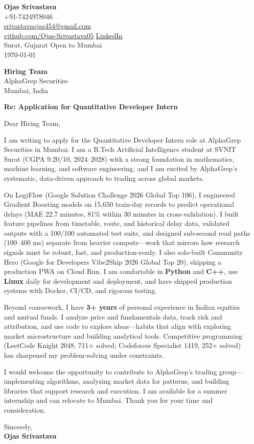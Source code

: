 \documentclass[a4paper,11pt]{article}
\begin{document}
\begin{flushright}
\textbf{Ojas Srivastava} \\
+91-7424978046 \\
\href{mailto:srivastavaojas454@gmail.com}{srivastavaojas454@gmail.com} \\
\href{https://github.com/Ojas-Srivastava05}{github.com/Ojas-Srivastava05} \textbar{}
\href{https://linkedin.com/in/ojas-srivastava05}{LinkedIn} \\
Surat, Gujarat \textbar{} Open to Mumbai \\
\today
\end{flushright}

\vspace{4mm}
\textbf{Hiring Team} \\
AlphaGrep Securities \\
Mumbai, India

\vspace{2mm}
\textbf{Re: Application for Quantitative Developer Intern}

Dear Hiring Team,

I am writing to apply for the Quantitative Developer Intern role at AlphaGrep Securities in Mumbai. I am a B.Tech Artificial Intelligence student at SVNIT Surat (CGPA 9.20/10, 2024--2028) with a strong foundation in mathematics, machine learning, and software engineering, and I am excited by AlphaGrep's systematic, data-driven approach to trading across global markets.

On LogiFlow (Google Solution Challenge 2026 Global Top 106), I engineered Gradient Boosting models on 15,650 train-day records to predict operational delays (MAE 22.7 minutes, 81\% within 30 minutes in cross-validation). I built feature pipelines from timetable, route, and historical delay data, validated outputs with a 100/100 automated test suite, and designed sub-second read paths (100--400 ms) separate from heavier compute---work that mirrors how research signals must be robust, fast, and production-ready. I also solo-built Community Hero (Google for Developers Vibe2Ship 2026 Global Top 20), shipping a production PWA on Cloud Run. I am comfortable in \textbf{Python} and \textbf{C++}, use \textbf{Linux} daily for development and deployment, and have shipped production systems with Docker, CI/CD, and rigorous testing.

Beyond coursework, I have \textbf{3+ years} of personal experience in Indian equities and mutual funds. I analyze price and fundamentals data, track risk and attribution, and use code to explore ideas---habits that align with exploring market microstructure and building analytical tools. Competitive programming (LeetCode Knight 2048, 711+ solved; Codeforces Specialist 1419, 252+ solved) has sharpened my problem-solving under constraints.

I would welcome the opportunity to contribute to AlphaGrep's trading group---implementing algorithms, analyzing market data for patterns, and building libraries that support research and execution. I am available for a summer internship and can relocate to Mumbai. Thank you for your time and consideration.

Sincerely, \\
\vspace{8mm}
\textbf{Ojas Srivastava}
\end{document}
